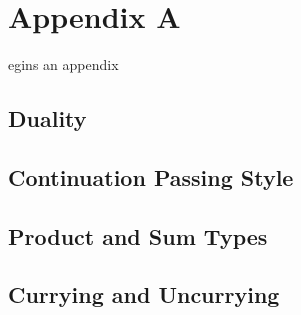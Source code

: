 %
%

\chapter{Appendix A}
\label{app:app01}

egins an appendix\\

\section{Duality}
\section{Continuation Passing Style}
\section{Product and Sum Types}
\section{Currying and Uncurrying}









\